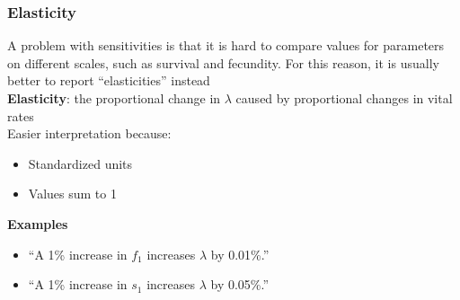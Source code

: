 \documentclass[color=usenames,dvipsnames]{beamer}\usepackage[]{graphicx}\usepackage[]{color}
\begin{document}
\begin{frame}
  \frametitle{Elasticity}
  A problem with sensitivities is that it is hard to compare values
  for parameters on different scales, such as survival and
  fecundity. For this reason, it is usually better to report
  ``elasticities'' instead \\
  \pause
  \vfill
  {\bf Elasticity}: the proportional change in $\lambda$ caused by
  proportional changes in vital rates \\
  \pause
  \vfill
   Easier interpretation because: %
   \begin{itemize}
     \item Standardized units
     \item Values sum to 1
   \end{itemize}
   \pause
   \vfill
   {\bf Examples}
  \begin{itemize}
    \item[] ``A 1\% increase in $f_1$ increases $\lambda$ by 0.01\%.''
    \item[] ``A 1\% increase in $s_1$ increases $\lambda$ by 0.05\%.''
  \end{itemize}

\end{frame}
\end{document}
